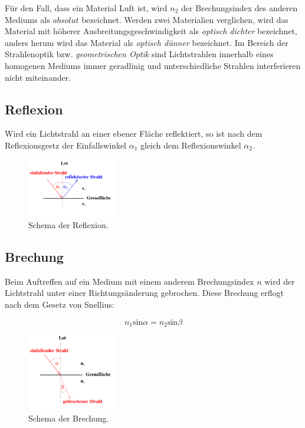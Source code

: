     \noindent Für den Fall, dass ein Material Luft ist, wird $n_2$ der Brechungsindex des anderen Mediums als $absolut$ bezeichnet. Werden zwei 
    Materialien verglichen, wird das Material mit höherer Ausbreitungsgeschwindigkeit als \textit{optisch dichter} bezeichnet, anders herum wird das 
    Material als \textit{optisch dünner} bezeichnet. Im Bereich der Strahlenoptik bzw. \textit{geometrischen Optik} sind Lichtstrahlen innerhalb eines 
    homogenen Mediums immer geradlinig und unterschiedliche Strahlen interferieren nicht miteinander.

    \subsection{Reflexion}

        \noindent Wird ein Lichtstrahl an einer ebener Fläche reflektiert, so ist nach dem Reflexionsgestz der Einfallswinkel $\alpha_1$ gleich dem
        Reflexionswinkel $\alpha_2$.

        \begin{figure}[H]
            \centering
            \includegraphics[width=0.35\textwidth]{latex/images/T2.PNG}
            \caption{Schema der Reflexion\protect \cite{V400}.}
        \end{figure}

    \subsection{Brechung}

        \noindent Beim Auftreffen auf ein Medium mit einem anderem Brechungsindex $n$ wird der Lichtstrahl unter einer Richtungsänderung 
        gebrochen. Diese Brechung erflogt nach dem Gesetz von Snellius:

        \begin{equation}
            n_1 \text{sin} \alpha = n_2 \text{sin} \beta
        \end{equation}

        \begin{figure}[H]
            \centering
            \includegraphics[width=0.35\textwidth]{latex/images/T3.PNG}
            \caption{Schema der Brechung\protect \cite{V400}.}
        \end{figure}

